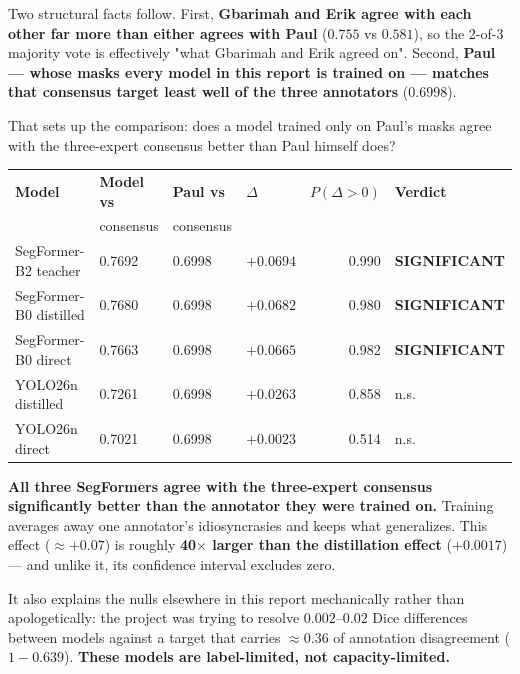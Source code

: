 \documentclass[11pt]{article}
\newcommand{\win}[1]{\textcolor{wingreen}{\textbf{#1}}}
\newcommand{\tabnote}[1]{\par\vspace{2pt}{\footnotesize\itshape #1}\par}
\begin{document}
Two structural facts follow. First, \textbf{Gbarimah and Erik agree with each other far more than
either agrees with Paul} ($0.755$ vs $0.581$), so the 2-of-3 majority vote is effectively "what
Gbarimah and Erik agreed on". Second, \textbf{Paul --- whose masks every model in this report is
trained on --- matches that consensus target least well of the three annotators} ($0.6998$).

That sets up the comparison: does a model trained only on Paul's masks agree with the three-expert
consensus better than Paul himself does?

\begin{center}\small
\begin{tabular}{>{\raggedright\arraybackslash}p{3.6cm} M M M n >{\raggedright\arraybackslash}p{2.85cm}}
\toprule
\textbf{Model} & \textbf{Model vs} & \textbf{Paul vs} & $\Delta$ & $P(\Delta{>}0)$ &
\textbf{Verdict} \\
 & consensus & consensus & & & \\
\midrule
SegFormer-B2 teacher   & 0.7692 & 0.6998 & $+0.0694$ & 0.990 & \win{SIGNIFICANT} \\
SegFormer-B0 distilled & 0.7680 & 0.6998 & $+0.0682$ & 0.980 & \win{SIGNIFICANT} \\
SegFormer-B0 direct    & 0.7663 & 0.6998 & $+0.0665$ & 0.982 & \win{SIGNIFICANT} \\
YOLO26n distilled      & 0.7261 & 0.6998 & $+0.0263$ & 0.858 & n.s. \\
YOLO26n direct         & 0.7021 & 0.6998 & $+0.0023$ & 0.514 & n.s. \\
\bottomrule
\end{tabular}
\end{center}

\tabnote{Paired subject-level cluster bootstrap, $B=4000$, both sides scored against the same
2-of-3 majority mask. 95\% CIs: B2 $[+0.010,+0.124]$, B0-distilled $[+0.003,+0.133]$,
B0-direct $[+0.005,+0.126]$.}

\begin{keybox}
\textbf{All three SegFormers agree with the three-expert consensus significantly better than the
annotator they were trained on.} Training averages away one annotator's idiosyncrasies and keeps
what generalizes. This effect ($\approx+0.07$) is roughly \textbf{40$\times$ larger than the
distillation effect} ($+0.0017$) --- and unlike it, its confidence interval excludes zero.

It also explains the nulls elsewhere in this report mechanically rather than apologetically:
the project was trying to resolve $0.002$--$0.02$ Dice differences between models against a target
that carries $\approx0.36$ of annotation disagreement ($1-0.639$). \textbf{These models are
label-limited, not capacity-limited.}
\end{keybox}
\end{document}
